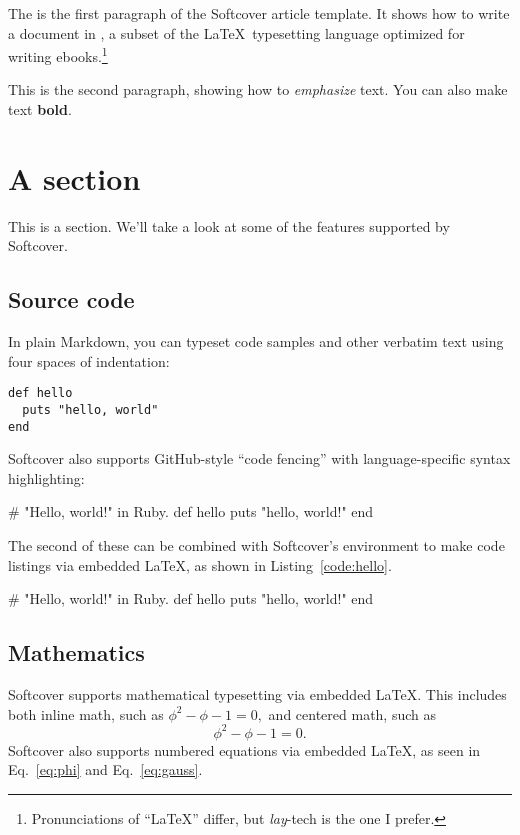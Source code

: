 The is the first paragraph of the Softcover article template. It shows how to write a document in \PolyTeX, a subset of the \LaTeX\ typesetting language optimized for writing ebooks.\footnote{Pronunciations of ``LaTeX'' differ, but \emph{lay}-tech is the one I prefer.}

This is the second paragraph, showing how to \emph{emphasize} text. You can also make text \textbf{bold}.

\section{A section}
\label{sec:a_section}

This is a section. We'll take a look at some of the features supported by Softcover.

\subsection{Source code}

In plain Markdown, you can typeset code samples and other verbatim text using four spaces of indentation:

\begin{verbatim}
def hello
  puts "hello, world"
end
\end{verbatim}

Softcover also supports GitHub-style ``code fencing'' with language-specific syntax highlighting:

\begin{code}
# "Hello, world!" in Ruby.
def hello
  puts "hello, world!"
end
\end{code}

The second of these can be combined with Softcover's  environment to make code listings via embedded \LaTeX, as shown in Listing~\ref{code:hello}.

\begin{codelisting}
\label{code:hello}
\begin{code}
# "Hello, world!" in Ruby.
def hello
  puts "hello, world!"
end
\end{code}
\end{codelisting}

\subsection{Mathematics}

Softcover supports mathematical typesetting via embedded \LaTeX. This includes both inline math, such as \( \phi^2 - \phi - 1 = 0, \) and centered math, such as
\[ \phi^2 - \phi - 1 = 0. \]
Softcover also supports numbered equations via embedded \LaTeX, as seen in Eq.~\eqref{eq:phi} and Eq.~\eqref{eq:gauss}.

